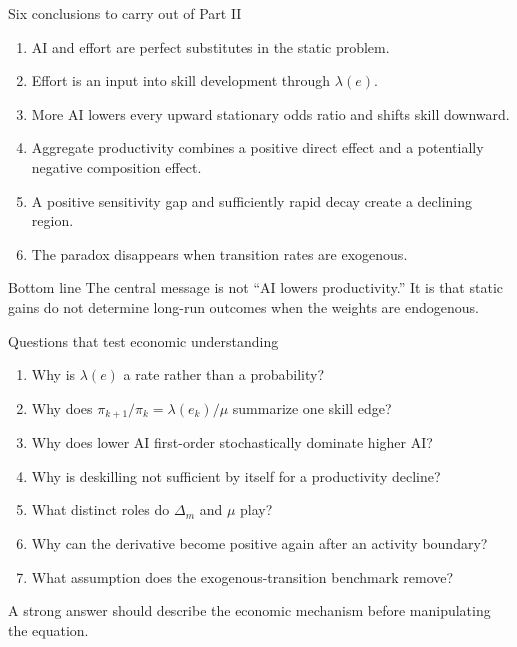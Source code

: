 \documentclass[aspectratio=169,11pt]{beamer}
\newcommand{\bottomline}[1]{%
  \begin{alertblock}{Bottom line}
  #1
  \end{alertblock}}
\begin{document}
\begin{frame}{Six conclusions to carry out of Part II}
\begin{enumerate}
  \item AI and effort are perfect substitutes in the static problem.
  \item Effort is an input into skill development through $\lambda(e)$.
  \item More AI lowers every upward stationary odds ratio and shifts skill downward.
  \item Aggregate productivity combines a positive direct effect and a potentially negative composition effect.
  \item A positive sensitivity gap and sufficiently rapid decay create a declining region.
  \item The paradox disappears when transition rates are exogenous.
\end{enumerate}
\vspace{3mm}
\bottomline{The central message is not ``AI lowers productivity.'' It is that static gains do not determine long-run outcomes when the weights are endogenous.}
\end{frame}

\begin{frame}{Questions that test economic understanding}
\begin{enumerate}
  \item Why is $\lambda(e)$ a rate rather than a probability?
  \item Why does $\pi_{k+1}/\pi_k=\lambda(e_k)/\mu$ summarize one skill edge?
  \item Why does lower AI first-order stochastically dominate higher AI?
  \item Why is deskilling not sufficient by itself for a productivity decline?
  \item What distinct roles do $\Delta_m$ and $\mu$ play?
  \item Why can the derivative become positive again after an activity boundary?
  \item What assumption does the exogenous-transition benchmark remove?
\end{enumerate}
\vspace{3mm}
\centering
\large A strong answer should describe the economic mechanism before manipulating the equation.
\end{frame}
\end{document}
